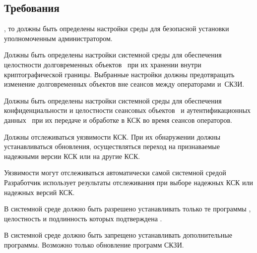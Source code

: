 \subsection{Требования}\label{ES.Reqs}

\label{R.ES.Install} %
,
то должны быть определены настройки среды для безопасной установки 
уполномоченным администратором.

\label{R.ES.Objects} %
Должны быть определены настройки системной среды
для обеспечения целостности долговременных объектов~ 
при их хранении внутри криптографической границы. 
%
Выбранные настройки должны предотвращать 
изменение долговременных объектов вне сеансов между операторами и~СКЗИ.

\label{R.ES.Session} %
Должны быть определены настройки системной среды
для обеспечения конфиденциальности и целостности сеансовых 
объектов~ и аутентификационных 
данных~ при их передаче и  
обработке в КСК во время сеансов операторов.

\label{R.ES.CVE} %
Должны отслеживаться уязвимости КСК. При их обнаружении должны 
устанавливаться обновления, осуществляться переход на признаваемые надежными
версии КСК или на другие КСК.

\begin{note*}
Уязвимости могут отслеживаться 
автоматически самой системной средой 
%
Разработчик использует результаты отслеживания при выборе надежных КСК или 
надежных версий КСК.
\end{note*}

\label{R.ES.AuthCode} %
В системной среде должно быть разрешено устанавливать только те программы
, 
целостность и подлинность которых подтверждена .

\label{R.ES.NoCode} %
В системной среде должно быть запрещено устанавливать дополнительные программы.
Возможно только обновление программ СКЗИ.

